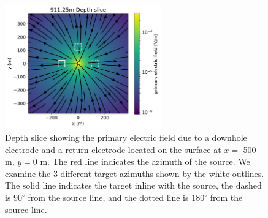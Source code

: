 \begin{figure}
    \begin{center}
    \includegraphics[width=0.6\textwidth]{figures/dc_casing/primary_3D.png}
    \end{center}
\caption{
    Depth slice showing the primary electric field due to a downhole
    electrode and a return electrode located on the surface at $x=$-500 m, $y=$0 m. The red line indicates the
    azimuth of the source.
    We examine the 3 different target azimuths shown by the white outlines.
    The solid line indicates the target inline with the source,
    the dashed is $90^\circ$ from the source line, and the dotted line is $180^\circ$ from the source line.
}
\label{fig:primary_3D}
\end{figure}
